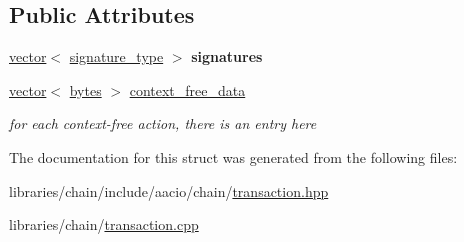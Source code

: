 \subsection*{Public Attributes}
\begin{DoxyCompactItemize}
\item 
\mbox{\label{structaacio_1_1chain_1_1signed__transaction_a302d185d07cf18219cc878d8f43f0a97}} 
\mbox{\hyperlink{classstd_1_1vector}{vector}}$<$ \mbox{\hyperlink{classfc_1_1crypto_1_1signature}{signature\+\_\+type}} $>$ {\bfseries signatures}
\item 
\mbox{\label{structaacio_1_1chain_1_1signed__transaction_adc8566b0377013a718f0e250b62d0adc}} 
\mbox{\hyperlink{classstd_1_1vector}{vector}}$<$ \mbox{\hyperlink{classstd_1_1vector}{bytes}} $>$ \mbox{\hyperlink{structaacio_1_1chain_1_1signed__transaction_adc8566b0377013a718f0e250b62d0adc}{context\+\_\+free\+\_\+data}}
\begin{DoxyCompactList}\small\item\em for each context-\/free action, there is an entry here \end{DoxyCompactList}\end{DoxyCompactItemize}


The documentation for this struct was generated from the following files\+:\begin{DoxyCompactItemize}
\item 
libraries/chain/include/aacio/chain/\mbox{\hyperlink{libraries_2chain_2include_2aacio_2chain_2transaction_8hpp}{transaction.\+hpp}}\item 
libraries/chain/\mbox{\hyperlink{transaction_8cpp}{transaction.\+cpp}}\end{DoxyCompactItemize}
